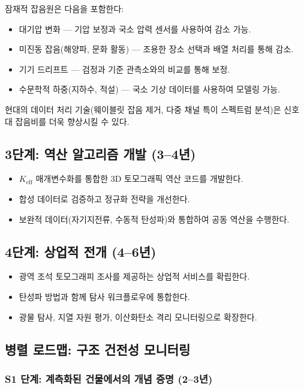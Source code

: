 \documentclass[12pt,a4paper]{article}
\theoremstyle{remark}
\newcommand{\Keff}{K_{\mathrm{eff}}}
\begin{document}
	잠재적 잡음원은 다음을 포함한다:
	\begin{itemize}
		\item 대기압 변화 — 기압 보정과 국소 압력 센서를 사용하여 감소 가능.
		\item 미진동 잡음(해양파, 문화 활동) — 조용한 장소 선택과 배열 처리를 통해 감소.
		\item 기기 드리프트 — 검정과 기준 관측소와의 비교를 통해 보정.
		\item 수문학적 하중(지하수, 적설) — 국소 기상 데이터를 사용하여 모델링 가능.
	\end{itemize}
	
	현대의 데이터 처리 기술(웨이블릿 잡음 제거, 다중 채널 특이 스펙트럼 분석)은 신호 대 잡음비를 더욱 향상시킬 수 있다.
	
	\subsection{3단계: 역산 알고리즘 개발 (3–4년)}
	
	\begin{itemize}
		\item \(\Keff\) 매개변수화를 통합한 3D 토모그래픽 역산 코드를 개발한다.
		\item 합성 데이터로 검증하고 정규화 전략을 개선한다.
		\item 보완적 데이터(자기지전류, 수동적 탄성파)와 통합하여 공동 역산을 수행한다.
	\end{itemize}
	
	\subsection{4단계: 상업적 전개 (4–6년)}
	
	\begin{itemize}
		\item 광역 조석 토모그래피 조사를 제공하는 상업적 서비스를 확립한다.
		\item 탄성파 방법과 함께 탐사 워크플로우에 통합한다.
		\item 광물 탐사, 지열 자원 평가, 이산화탄소 격리 모니터링으로 확장한다.
	\end{itemize}
	
	\subsection{병렬 로드맵: 구조 건전성 모니터링}
	
	\subsubsection{S1 단계: 계측화된 건물에서의 개념 증명 (2–3년)}
	
\end{document}
